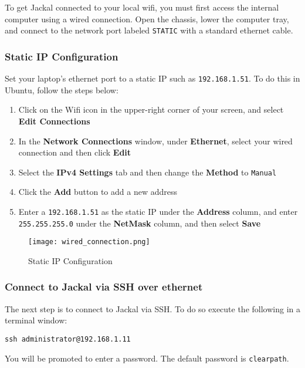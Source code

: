 \documentclass[]{clearpath-latex/clearpath-manual}
\begin{document}
To get Jackal connected to your local wifi, you must first access the internal computer
using a wired connection. Open the chassis, lower the computer tray, and connect to the network port
labeled \lstinline{STATIC} with a standard ethernet cable.

\subsubsection{Static IP Configuration}

Set your laptop's ethernet port to a static IP such as \lstinline{192.168.1.51}.  To do this in Ubuntu, follow the steps below:
\begin{enumerate}
  \item Click on the Wifi icon in the upper-right corner of your screen, and select \textbf{Edit Connections}
  \item In the \textbf{Network Connections} window, under \textbf{Ethernet}, select your wired connection and then click \textbf{Edit}
  \item Select the \textbf{IPv4 Settings} tab and then change the \textbf{Method} to \lstinline{Manual}
  \item Click the \textbf{Add} button to add a new address
  \item Enter a \lstinline{192.168.1.51} as the static IP under the \textbf{Address} column, and enter \lstinline{255.255.255.0} under the \textbf{NetMask} column, and then select \textbf{Save}
\end{enumerate}

\begin{figure}[H]
  \centering
  \texttt{[image: wired\_connection.png]}
  \caption{Static IP Configuration}
  \label{staticip}
\end{figure}


\subsubsection{Connect to Jackal via SSH over ethernet}

The next step is to connect to Jackal via SSH.  To do so execute the following in a terminal window:

\begin{lstlisting}
ssh administrator@192.168.1.11
\end{lstlisting}

You will be promoted to enter a password.  The default password is \lstinline{clearpath}.
\end{document}
